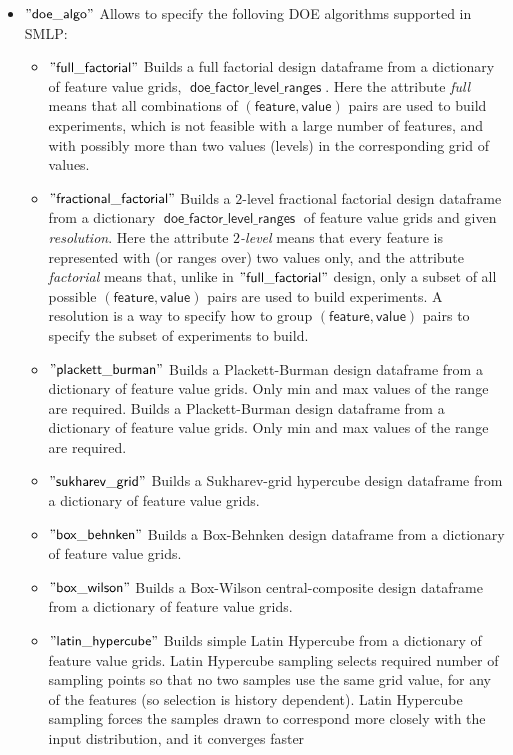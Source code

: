 \documentclass[a4paper,parskip=half]{article} %
\newcommand*\speckey[1]{\operatorname{\mathsf{"{#1}"}}} %
\newcommand*\specval[1]{\operatorname{\mathsf{{#1}}}} %
\begin{document}
\begin{itemize}
\item $\speckey{doe\_algo}$ Allows to specify the folloving DOE algorithms supported in SMLP: 
\begin{itemize}
\item $\speckey{full\_factorial}$ Builds a full factorial design dataframe from a dictionary of feature value grids,  $\specval{doe\_factor\_level\_ranges}$.
Here the attribute \emph{full} means that all combinations of $\specval{(feature,value)}$ pairs are used to build experiments, which is not feasible
with a large number of features, and with possibly more than two values (levels) in the corresponding grid of values.
\item $\speckey{fractional\_factorial}$ Builds a $2$-level fractional factorial design dataframe from a dictionary $\specval{doe\_factor\_level\_ranges}$ of 
feature value grids and given \emph{resolution}. Here the attribute \emph{$2$-level} means that every feature is represented with (or ranges over) two values only, 
and the attribute \emph{factorial} means that, unlike in $\speckey{full\_factorial}$ design, only a subset of all possible  $\specval{(feature,value)}$ pairs
are used to build experiments. A resolution is a way to specify how to group $\specval{(feature,value)}$ pairs to specify the subset of experiments to build.
\item $\speckey{plackett\_burman}$ Builds a Plackett-Burman design dataframe from a dictionary of feature value grids. Only min and max values of 
the range are required. Builds a Plackett-Burman design dataframe from a dictionary of feature value grids. Only min and max values of the range are required.
\item $\speckey{sukharev\_grid}$ Builds a Sukharev-grid hypercube design dataframe from a dictionary of feature value grids.
\item $\speckey{box\_behnken}$ Builds a Box-Behnken design dataframe from a dictionary of feature value grids.
\item $\speckey{box\_wilson}$ Builds a Box-Wilson central-composite design dataframe from a dictionary of feature value grids.
\item $\speckey{latin\_hypercube}$ Builds simple Latin Hypercube from a dictionary of feature value grids.
Latin Hypercube  sampling selects required number of sampling points so that no two samples use the same grid value, for any
of the features (so selection is history dependent). 
 Latin Hypercube sampling forces the samples drawn to correspond more closely with the input distribution, and it converges faster

\end{itemize}
\end{itemize}
\end{document}

